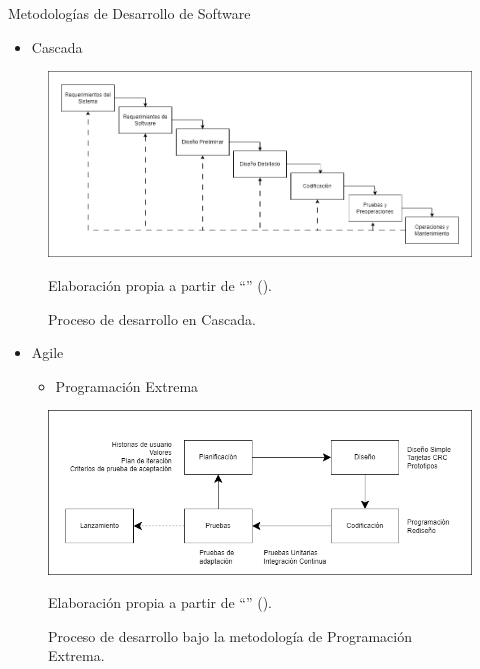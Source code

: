 \documentclass[spanish, aspectratio=169]{beamer}
\begin{document}
\begin{frame}[allowframebreaks]{Metodologías de Desarrollo de Software}
  \begin{itemize}
      \item Cascada
  \end{itemize}

  \begin{figure}
    \centering
    \includegraphics[width=.8\textwidth]{../images/marcoteorico/modelo_cascada.png}
    \caption{Proceso de desarrollo en Cascada.}
      \vspace{-0.2cm}
    \footnotesize{{Elaboración propia a partir de ``\textit{}'' (\citeyear{auer1990solution}).}}
    \label{fig:modelo_desarrollo_cascada} 
  \end{figure}

  \begin{itemize}
      \item Agile
      \begin{itemize}
          \item Programación Extrema
      \end{itemize}
    \end{itemize}
    
    \begin{figure}
      \centering
      \includegraphics[width=.8\textwidth]{../images/marcoteorico/modelo_xp.png}
      \caption{Proceso de desarrollo bajo la metodología de Programación Extrema.}
        \vspace{-0.2cm}
      \footnotesize{{Elaboración propia a partir de ``\textit{}'' (\citeyear{pressman2005software}).}}
      \label{fig:modelo_desarrollo_xp} 
    \end{figure}


\end{frame}
\end{document}
